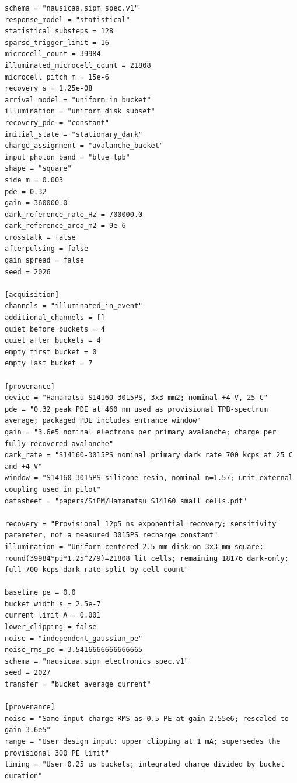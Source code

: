 \documentclass[11pt,a4paper]{article}
\begin{document}
\begin{Verbatim}[breaklines,breakanywhere,fontsize=\footnotesize]
schema = "nausicaa.sipm_spec.v1"
response_model = "statistical"
statistical_substeps = 128
sparse_trigger_limit = 16
microcell_count = 39984
illuminated_microcell_count = 21808
microcell_pitch_m = 15e-6
recovery_s = 1.25e-08
arrival_model = "uniform_in_bucket"
illumination = "uniform_disk_subset"
recovery_pde = "constant"
initial_state = "stationary_dark"
charge_assignment = "avalanche_bucket"
input_photon_band = "blue_tpb"
shape = "square"
side_m = 0.003
pde = 0.32
gain = 360000.0
dark_reference_rate_Hz = 700000.0
dark_reference_area_m2 = 9e-6
crosstalk = false
afterpulsing = false
gain_spread = false
seed = 2026

[acquisition]
channels = "illuminated_in_event"
additional_channels = []
quiet_before_buckets = 4
quiet_after_buckets = 4
empty_first_bucket = 0
empty_last_bucket = 7

[provenance]
device = "Hamamatsu S14160-3015PS, 3x3 mm2; nominal +4 V, 25 C"
pde = "0.32 peak PDE at 460 nm used as provisional TPB-spectrum average; packaged PDE includes entrance window"
gain = "3.6e5 nominal electrons per primary avalanche; charge per fully recovered avalanche"
dark_rate = "S14160-3015PS nominal primary dark rate 700 kcps at 25 C and +4 V"
window = "S14160-3015PS silicone resin, nominal n=1.57; unit external coupling used in pilot"
datasheet = "papers/SiPM/Hamamatsu_S14160_small_cells.pdf"

recovery = "Provisional 12p5 ns exponential recovery; sensitivity parameter, not a measured 3015PS recharge constant"
illumination = "Uniform centered 2.5 mm disk on 3x3 mm square: round(39984*pi*1.25^2/9)=21808 lit cells; remaining 18176 dark-only; full 700 kcps dark rate split by cell count"

baseline_pe = 0.0
bucket_width_s = 2.5e-7
current_limit_A = 0.001
lower_clipping = false
noise = "independent_gaussian_pe"
noise_rms_pe = 3.5416666666666665
schema = "nausicaa.sipm_electronics_spec.v1"
seed = 2027
transfer = "bucket_average_current"

[provenance]
noise = "Same input charge RMS as 0.5 PE at gain 2.55e6; rescaled to gain 3.6e5"
range = "User design input: upper clipping at 1 mA; supersedes the provisional 300 PE limit"
timing = "User 0.25 us buckets; integrated charge divided by bucket duration"

\end{Verbatim}
\end{document}
